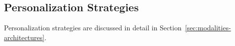\subsection{Personalization Strategies}
\label{sec:personalization}

Personalization strategies are discussed in detail in Section~\ref{sec:modalities-architectures}.

